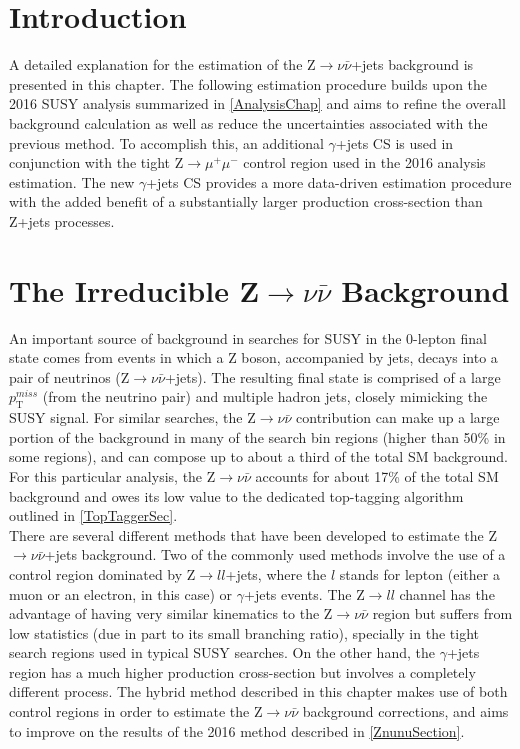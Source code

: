 \section{Introduction}

A detailed explanation for the estimation of the Z$\rightarrow\nu\bar{\nu}$+jets background is presented in this chapter. The following estimation procedure builds upon the 2016 SUSY analysis summarized in \autoref{AnalysisChap} and aims to refine the overall background calculation as well as reduce the uncertainties associated with the previous method. To accomplish this, an additional $\gamma$+jets CS is used in conjunction with the tight Z$\rightarrow\mu^{+}\mu^{-}$ control region used in the 2016 analysis estimation. The new $\gamma$+jets CS provides a more data-driven estimation procedure with the added benefit of a substantially larger production cross-section than Z+jets processes\cite{Zgamma}.  

\section{The Irreducible Z$\rightarrow\nu\bar{\nu}$ Background}

An important source of background in searches for SUSY in the 0-lepton final state comes from events in which a Z boson, accompanied by jets, decays into a pair of neutrinos (Z$\rightarrow\nu\bar{\nu}$+jets). The resulting final state is comprised of a large $p_\text{T}^{miss}$ (from the neutrino pair) and multiple hadron jets, closely mimicking the SUSY signal. For similar searches, the Z$\rightarrow\nu\bar{\nu}$ contribution can make up a large portion of the background in many of the search bin regions (higher than 50\% in some regions)\cite{OtherAna1,OtherAna2}, and can compose up to about a third of the total SM background. For this particular analysis, the Z$\rightarrow\nu\bar{\nu}$ accounts for about 17\% of the total SM background and owes its low value to the dedicated top-tagging algorithm outlined in \autoref{TopTaggerSec}.\\

There are several different methods that have been developed to estimate the Z$\rightarrow\nu\bar{\nu}$+jets background\cite{ZInv}. Two of the commonly used methods involve the use of a control region dominated by Z$\rightarrow ll$+jets, where the $l$ stands for lepton (either a muon or an electron, in this case) or $\gamma$+jets events. The Z$\rightarrow ll$ channel has the advantage of having very similar kinematics to the Z$\rightarrow\nu\bar{\nu}$ region but suffers from low statistics (due in part to its small branching ratio), specially in the tight search regions used in typical SUSY searches. On the other hand, the $\gamma$+jets region has a much higher production cross-section but involves a completely different process. The hybrid method described in this chapter makes use of both control regions in order to estimate the Z$\rightarrow\nu\bar{\nu}$ background corrections, and aims to improve on the results of the 2016 method described in \autoref{ZnunuSection}.

